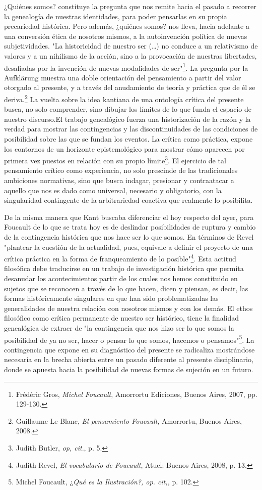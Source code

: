 ¿Quiénes somos? constituye la pregunta que nos remite hacia el pasado a
recorrer la genealogía de nuestras identidades, para poder pensarlas en
su propia precariedad histórica. Pero además, ¿quiénes somos? nos lleva,
hacia adelante a una conversión ética de nosotros mismos, a la
autoinvención política de nuevas subjetividades. "La historicidad de
nuestro ser (\dots) no conduce a un relativismo de valores y a un
nihilismo de la acción, sino a la provocación de nuestras libertades,
desafiadas por la invención de nuevas modalidades de ser"\footnote{Frédéric
  Gros, \emph{Michel Foucault}, Amorrortu Ediciones, Buenos Aires, 2007,
  pp. 129-130.}. La pregunta por la Aufklärung muestra una doble
orientación del pensamiento a partir del valor otorgado al presente, y a
través del anudamiento de teoría y práctica que de él se
deriva.\footnote{Guillaume Le Blanc, \emph{El pensamiento Foucault},
  Amorrortu, Buenos Aires, 2008.} La vuelta sobre la idea kantiana de
una ontología crítica del presente busca, no solo comprender, sino
dibujar los límites de lo que funda el espacio de nuestro discurso.El
trabajo genealógico fuerza una historización de la razón y la verdad
para mostrar las contingencias y las discontinuidades de las condiciones
de posibilidad sobre las que se fundan los eventos. La crítica como
práctica, expone los contornos de un horizonte epistemológico para
mostrar cómo aparecen por primera vez puestos en relación con su propio
límite\footnote{Judith Butler, \emph{op, cit}., p. 5.}. El ejercicio de
tal pensamiento crítico como experiencia, no solo prescinde de las
tradicionales ambiciones normativas, sino que busca indagar, presionar y
contraatacar a aquello que nos es dado como universal, necesario y
obligatorio, con la singularidad contingente de la arbitrariedad
coactiva que realmente lo posibilita.

De la misma manera que Kant buscaba diferenciar el hoy respecto del
ayer, para Foucault de lo que se trata hoy es de deslindar posibilidades
de ruptura y cambio de la contingencia histórica que nos hace ser lo que
somos. En términos de Revel "plantear la cuestión de la actualidad,
pues, equivale a definir el proyecto de una crítica práctica en la forma
de franqueamiento de lo posible"\footnote{Judith Revel, \emph{El
  vocabulario de Foucault}, Atuel: Buenos Aires, 2008, p. 13.}. Esta
actitud filosófica debe traducirse en un trabajo de investigación
histórica que permita desanudar los acontecimientos partir de los cuales
nos hemos constituido en sujetos que se reconocen a través de lo que
hacen, dicen y piensan, es decir, las formas históricamente singulares
en que han sido problematizadas las generalidades de nuestra relación
con nosotros mismos y con los demás. El ethos filosófico como crítica
permanente de nuestro ser histórico, tiene la finalidad genealógica de
extraer de "la contingencia que nos hizo ser lo que somos la posibilidad
de ya no ser, hacer o pensar lo que somos, hacemos o
pensamos"\footnote{Michel Foucault, ¿\emph{Qué es la Ilustración?, op.
  cit,,} p. 102.}. La contingencia que expone en su diagnóstico del
presente se radicaliza mostrándose necesaria en la brecha abierta entre
un pasado diferente al presente disciplinario, donde se apuesta hacia la
posibilidad de nuevas formas de sujeción en un futuro.

